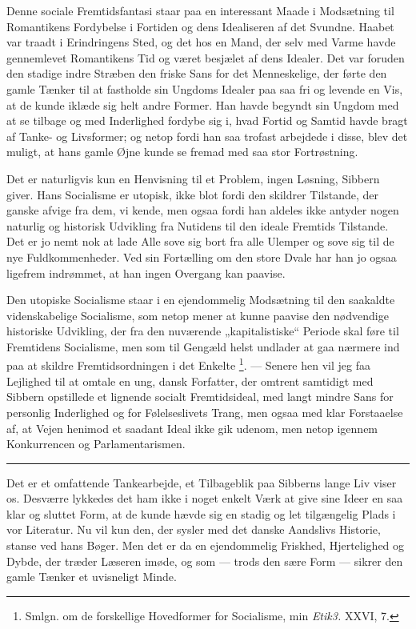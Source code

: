 \documentclass[12pt,a4paper,openany]{book}
\newcommand{\opage}[1]{\marginnote{\footnotesize\textit{[#1]}}}
\begin{document}
Denne sociale Fremtidsfantasi staar paa en interessant Maade i Modsætning til
Romantikens Fordybelse i Fortiden og dens Idealiseren af det Svundne. Haabet
var traadt i Erindringens Sted, og det hos en Mand, der selv med Varme havde
gennemlevet Romantikens Tid og været besjælet af dens Idealer. Det var foruden
den stadige indre Stræben den friske Sans for det Menneskelige, der førte den
gamle Tænker til at fastholde sin Ungdoms Idealer paa saa fri og levende en
Vis, at de kunde iklæde sig helt andre Former. Han havde begyndt sin Ungdom med
at se tilbage og med Inderlighed fordybe sig i, hvad Fortid og Samtid havde
bragt af Tanke- og Livsformer; og netop fordi han saa trofast arbejdede i
disse, blev det muligt, at hans gamle Øjne kunde se fremad med saa stor Fortrøstning.

Det er naturligvis kun en Henvisning til et Problem, ingen Løsning, Sibbern
giver. Hans Socialisme er utopisk, ikke blot fordi den skildrer Tilstande, der
ganske afvige fra dem, vi kende, men ogsaa fordi han aldeles ikke antyder nogen
naturlig og historisk Udvikling fra Nutidens til den ideale Fremtids Tilstande.
Det er jo nemt nok at lade Alle sove sig bort fra alle Ulemper og sove sig til
de nye Fuldkommenheder. Ved sin Fortælling om den store Dvale har han jo ogsaa
ligefrem indrømmet, at han ingen Overgang kan paavise.

Den utopiske Socialisme staar i en ejendommelig Modsætning til den saakaldte
videnskabelige Socialisme, som netop mener at kunne paavise den nødvendige
historiske Udvikling, der fra den nuværende „kapitalistiske“ Periode skal føre
til Fremtidens Socialisme, men som til Gengæld helst undlader at gaa nærmere
ind paa at skildre Fremtidsordningen i det Enkelte%
\footnote[1]{Smlgn. om de forskellige Hovedformer for Socialisme, min
\textit{Etik3.} XXVI, 7.}. --- Senere hen vil jeg faa Lejlighed til at omtale
en ung, dansk Forfatter, der omtrent samtidigt med Sibbern
\setcounter{footnote}{0}%
\opage{117}opstillede et lignende socialt Fremtidsideal, med langt mindre Sans
for personlig Inderlighed og for Følelseslivets Trang, men ogsaa med klar
Forstaaelse af, at Vejen henimod et saadant Ideal ikke gik udenom, men netop
igennem Konkurrencen og Parlamentarismen.

\begin{center}\rule{2cm}{0.4pt}\end{center}

Det er et omfattende Tankearbejde, et Tilbageblik paa Sibberns lange Liv viser
os. Desværre lykkedes det ham ikke i noget enkelt Værk at give sine Ideer en
saa klar og sluttet Form, at de kunde hævde sig en stadig og let tilgængelig
Plads i vor Literatur. Nu vil kun den, der sysler med det danske Aandslivs
Historie, stanse ved hans Bøger. Men det er da en ejendommelig Friskhed,
Hjertelighed og Dybde, der træder Læseren imøde, og som --- trods den sære Form
--- sikrer den gamle Tænker et uvisneligt Minde.
\end{document}
